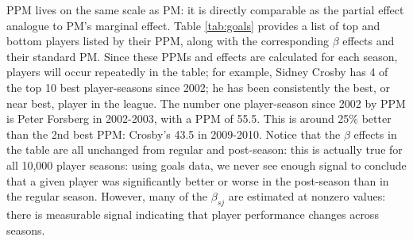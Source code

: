 PPM lives on the same scale as PM: it is directly comparable as the partial
effect analogue to PM's marginal effect.  Table \ref{tab:goals} provides a
list of top and bottom players listed by their PPM, along with the
corresponding $\beta$ effects and their standard PM.  Since these PPMs and
effects are calculated for each season, players will occur repeatedly in the
table; for example, Sidney Crosby has 4 of the top 10 best player-seasons
since 2002; he has been consistently the best, or near best, player in the
league.  The number one player-season since 2002 by PPM is Peter Forsberg in 2002-2003,
with a PPM of 55.5.  This is around 25\% better than the 2nd best PPM:
Crosby's 43.5 in 2009-2010.  Notice that the $\beta$ effects in the table are
all unchanged from regular and post-season: this is actually true for all
10,000 player seasons: using goals data, we never see enough signal to conclude
that a given player was significantly better or worse in the post-season than
in the regular season.  However, many of the $\beta_{sj}$ are estimated at
nonzero values: there is measurable signal indicating that player performance
changes across seasons.

